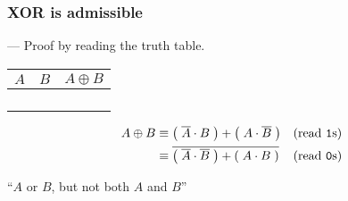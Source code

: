 

\begin{frame}

\frametitle{XOR is admissible}

\begin{flushright}
--- Proof by reading the truth table.
\end{flushright}

\begin{center}

\begin{tabular}{cc|>{\centering\arraybackslash}p{0.4in}}
$A$ & $B$ & $A \oplus B$ \\\hline
\bz{} & \bz{} & \bz{} \\
\bz{} & \bo{} & \bo{} \\
\bo{} & \bz{} & \bo{} \\
\bo{} & \bo{} & \bz{}
\end{tabular}

\vspace{\fill}

\begin{align*}
A \oplus B %
&\equiv \p{\overline{A} \cdot B} + \p{A \cdot \overline{B}} & \text{(read \texttt{1}s)}\\
&\equiv \overline{\p{\overline{A} \cdot \overline{B}} + \p{A \cdot B}} & \text{(read \texttt{0}s)}
\end{align*}

``$A$ or $B$, but not both $A$ and $B$''

\end{center}

\end{frame}


